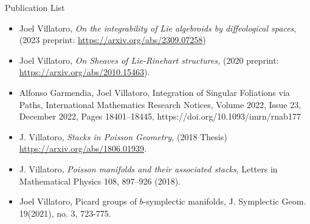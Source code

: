 \documentclass[12]{article}
\begin{document}
\huge
\begin{center}
Publication List
\end{center}
\large
\begin{itemize}



\item Joel Villatoro, \textit{On the integrability of Lie algebroids by diffeological spaces}, (2023 preprint: \url{https://arxiv.org/abs/2309.07258})

\item Joel Villatoro, \textit{On Sheaves of Lie-Rinehart structures,} (2020 preprint: \url{https://arxiv.org/abs/2010.15463}).

\item Alfonso Garmendia, Joel Villatoro, Integration of Singular Foliations via Paths, International Mathematics Research Notices, Volume 2022, Issue 23, December 2022, Pages 18401–18445, https://doi.org/10.1093/imrn/rnab177

\item J. Villatoro, \textit{Stacks in Poisson Geometry,}
(2018 Thesis) \url{https://arxiv.org/abs/1806.01939}.

\item J. Villatoro, \textit{Poisson manifolds and their associated stacks}, Letters in Mathematical Physics 108, 897–926 (2018).

\item Joel Villatoro, Picard groups of $b$-symplectic manifolds, J. Symplectic Geom. 19(2021), no. 3, 723-775.
\end{itemize}
\end{document}
